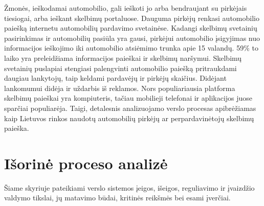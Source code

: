 \documentclass[12pt]{article}
\begin{document}
	Žmonės, ieškodamai automobilio, gali ieškoti jo arba bendraujant su pirkėjais tiesiogai, arba ieškant skelbimų portaluose. Dauguma pirkėjų renkasi automobilio paiešką internetu automobilių pardavimo svetainėse. Kadangi skelbimų svetainių pasirinkimas ir automobilių pasiūla yra gausi, pirkėjui automobilio įsigyjimas nuo informacijos ieškojimo iki automobilio atsiėmimo trunka apie 15 valandų. 59\% to laiko yra preleidžiama informacijos paieškai ir skelbimų naršymui. Skelbimų svetainių puslapiai stengiasi palengvinti automobilio paiešką pritraukdami daugiau lankytojų, taip keldami pardavėjų ir pirkėjų skaičius. Didėjant lankomumui didėja ir uždarbis iš reklamos. Nors populiariausia platforma skelbimų paieškai yra kompiuteris, tačiau mobilieji telefonai ir aplikacijos juose sparčiai populiarėja. Taigi, detalesnis analizuojamo verslo procesas apibrėžiamas kaip Lietuvos rinkos naudotų automobilių pirkėjų ar perpardavinėtojų skelbimų paieška.
	\pagebreak
	
	\section{Išorinė proceso analizė}
	Šiame skyriuje pateikiami verslo sistemos įeigos, išeigos, reguliavimo ir įvaizdžio valdymo tikslai, jų matavimo būdai, kritinės reikšmės bei esami įverčiai.
	
\end{document}
